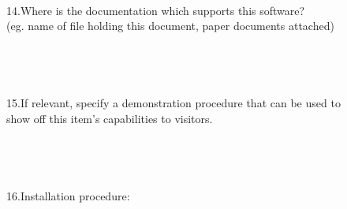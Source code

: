 \begin{tabbing}
\\
14.\>Where is the documentation which supports this software?\\
\>(eg. name of file holding this document, paper documents attached)\\
\\
\\
\\
\\
15.\>If relevant, specify a demonstration procedure that can be used to\\
\>show off this item's capabilities to visitors.\\
\\
\\
\\
\\
16.\>Installation procedure:
\end{tabbing}


                                                                                                                                                                                                                                                                                                                                                                                                                                                                                                                                                                                    